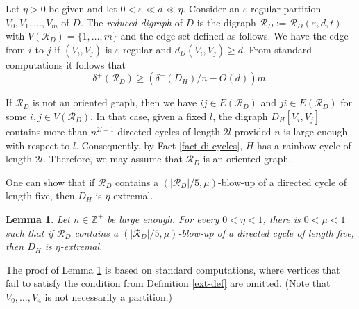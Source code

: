 \documentclass{article}
\newtheorem{lemma}[theorem]{Lemma}
\renewcommand{\epsilon}{{\varepsilon}}
\begin{document}
Let $\eta>0$ be given and let $0<\epsilon \ll d\ll \eta$.  Consider an $\epsilon$-regular partition $V_0, V_1,\dots, V_m$ of $D$.
The {\it reduced digraph} of $D$ is the digraph $\mathcal{R}_D:=\mathcal{R}_D(\epsilon, d, t)$  with $V(\mathcal{R}_D)=\{1, \dots, m\}$ and the edge  set defined as follows. We have the edge from $i$ to $j$ if $(V_i, V_j)$ is $\epsilon$-regular and $d_D(V_i, V_j)\geq d$. From standard computations it follows that 
\begin{equation}\label{deltsR}\delta^+(\mathcal{R}_D)\geq (\delta^+(D_H)/n -O(d))m.\end{equation}

If $\mathcal{R}_D$ is not an oriented graph, then we have $ij\in E(\mathcal{R}_D)$ and $ji\in E(\mathcal{R}_D)$ for some $i,j\in V(\mathcal{R}_D)$. In that case, given a fixed $l$, the digraph $D_H[V_i, V_j]$ contains more than $n^{2l-1}$ directed cycles of length $2l$ provided $n$ is large enough with respect to $l$. Consequently, by Fact \ref{fact-di-cycles}, $H$ has a rainbow cycle of length $2l$. Therefore, we may assume that 
$\mathcal{R}_D$ is an oriented graph. 

One can show that if $\mathcal{R}_D$ contains a $(|\mathcal{R}_D|/5, \mu)$-blow-up of a directed cycle of length five, then $D_H$ is $\eta$-extremal. 
 \begin{lemma}\label{blow-up-extremal-lem}
 Let $n\in \mathbb{Z}^+$ be large enough. For every $0<\eta<1$, there is $0<\mu<1$ such that if $\mathcal{R}_D$ contains a $(|\mathcal{R}_D|/5, \mu)$-blow-up of a directed cycle of length five, then $D_H$ is $\eta$-extremal. 
 \end{lemma}
 The proof of Lemma \ref{blow-up-extremal-lem} is based on standard computations, where vertices that fail to satisfy the condition from Definition \ref{ext-def} are omitted. (Note that $V_0,\dots, V_4$ is not necessarily a partition.) 
\end{document}
